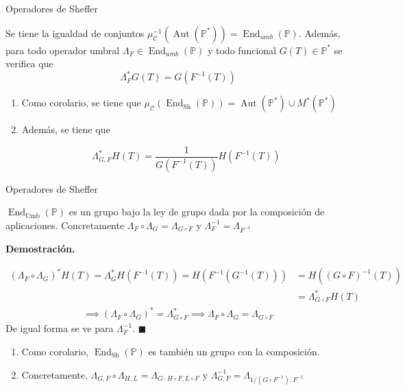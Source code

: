 \documentclass{beamer}
\newenvironment{teorema}[1][]{
  \begin{tcolorbox}[colback=darkred!10, colframe=darkred!90, title=Teorema\ #1, fonttitle=\bfseries]
}{
  \end{tcolorbox}
}
\newenvironment{demo}{%
  \par\medskip\noindent\textbf{Demostración.}\hspace{0.5em}%
}{%
  \hfill$\blacksquare$\par\medskip%
}
\newcommand{\poly}{\mathbb{P}} %
\DeclareMathOperator*{\End}{End} %
\DeclareMathOperator*{\Aut}{Aut} %
\begin{document}
\begin{frame}{Operadores de Sheffer}
  \begin{teorema}[(caracterización operadores umbrales)]
    Se tiene la igualdad de conjuntos $\mu_{\mathcal{C}}^{-1}(\Aut(\poly^*)) = \End_{umb}(\poly)$. Además, para todo operador umbral $\Lambda_F \in \End_{umb}(\poly)$ y todo funcional $G(T) \in \poly^*$ se verifica que
    \begin{equation*}
        \Lambda_F^*G(T) = G(F^{-1}(T))
    \end{equation*}
  \end{teorema}

  \begin{enumerate}
    \item Como corolario, se tiene que $\mu_{\mathcal{C}}(\End_{\mathrm{Sh}}(\poly)) = \Aut(\poly^*) \cup M^*(\poly^*)$
    \item Además, se tiene que 
      \begin{block}{}
        \begin{equation*}
          \Lambda_{G,F}^*H(T) = \frac{1}{G(F^{-1}(T))} H(F^{-1}(T)) 
        \end{equation*}
      \end{block}
  \end{enumerate}
\end{frame}

\begin{frame}{Operadores de Sheffer}
  
  \begin{teorema}
    $\End_{\mathrm{Umb}}(\poly)$ es un grupo bajo la ley de grupo dada por la composición de aplicaciones. Concretamente $\Lambda_F \circ \Lambda_G = \Lambda_{G \circ F} \text{ y } \Lambda_F^{-1} = \Lambda_{F^{-1}}$
  \end{teorema}

  \begin{demo}
    \begin{align*}
        (\Lambda_F \circ \Lambda_G)^*H(T) = \Lambda_G^* H(F^{-1}(T)) = H(F^{-1}(G^{-1}(T))) & = H((G \circ F)^{-1}(T)) \\
        & = \Lambda_{G \circ F}^*H(T)
    \end{align*}
    \begin{align*}
      \implies (\Lambda_F \circ \Lambda_G)^* = \Lambda_{G \circ F}^* \implies \Lambda_F \circ \Lambda_G = \Lambda_{G \circ F}
    \end{align*}
    De igual forma se ve para $\Lambda_F^{-1}$.
  \end{demo}
  \begin{block}{}
    \begin{enumerate}
      \item Como corolario, $\End_{\mathrm{Sh}}(\poly)$ es también un grupo con la composición.
      \item Concretamente, $\Lambda_{G,F} \circ \Lambda_{H,L} = \Lambda_{G \cdot H \circ F, L \circ F} \text{ y } \Lambda_{G, F}^{-1} = \Lambda_{1/(G   \circ F^{-1}), F^{-1}}$
    \end{enumerate}
  \end{block}
\end{frame}
\end{document}

